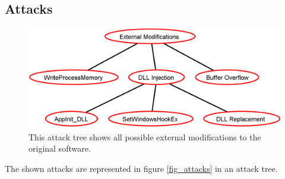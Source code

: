\subsection{Attacks}

\begin{figure}[h]
\centering
\includegraphics[scale=0.35]{sections/adtrees/ExternalModificationsWithoutDefenses.png}
\caption{This attack tree shows all possible external modifications to the original software.}
\end{figure}



The shown attacks are represented in figure \ref{fig_attacks} in an attack tree.

